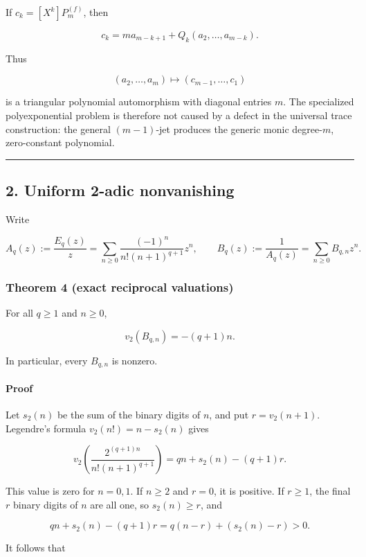\documentclass[11pt]{article}
\theoremstyle{keio}
\theoremstyle{definition}
\theoremstyle{remark}
\begin{document}
If \(c_k=[X^k]P_m^{(f)}\), then

\[
 c_k=ma_{m-k+1}+Q_k(a_2,\ldots,a_{m-k}).
\]

Thus

\[
 (a_2,\ldots,a_m)\longmapsto(c_{m-1},\ldots,c_1)
\]

is a triangular polynomial automorphism with diagonal entries \(m\). The
specialized polyexponential problem is therefore not caused by a defect in
the universal trace construction: the general \((m-1)\)-jet produces the
generic monic degree-\(m\), zero-constant polynomial.

\begin{center}\rule{0.5\linewidth}{0.5pt}\end{center}

\subsection{2. Uniform 2-adic nonvanishing}

Write

\[
 A_q(z):=\frac{E_q(z)}z
 =\sum_{n\geq0}\frac{(-1)^n}{n!(n+1)^{q+1}}z^n,
 \qquad
 B_q(z):=\frac1{A_q(z)}=\sum_{n\geq0}B_{q,n}z^n.
\]

\subsubsection{Theorem 4 (exact reciprocal valuations)}

For all \(q\geq1\) and \(n\geq0\),

\[
 v_2(B_{q,n})=-(q+1)n.
\]

In particular, every \(B_{q,n}\) is nonzero.

\paragraph{Proof}

Let \(s_2(n)\) be the sum of the binary digits of \(n\), and put
\(r=v_2(n+1)\). Legendre's formula \(v_2(n!)=n-s_2(n)\) gives

\[
 v_2\!\left(
 \frac{2^{(q+1)n}}{n!(n+1)^{q+1}}
 \right)
 =qn+s_2(n)-(q+1)r.
\]

This value is zero for \(n=0,1\). If \(n\geq2\) and \(r=0\), it is
positive. If \(r\geq1\), the final \(r\) binary digits of \(n\) are all
one, so \(s_2(n)\geq r\), and

\[
 qn+s_2(n)-(q+1)r
 =q(n-r)+(s_2(n)-r)>0.
\]

It follows that
\end{document}
